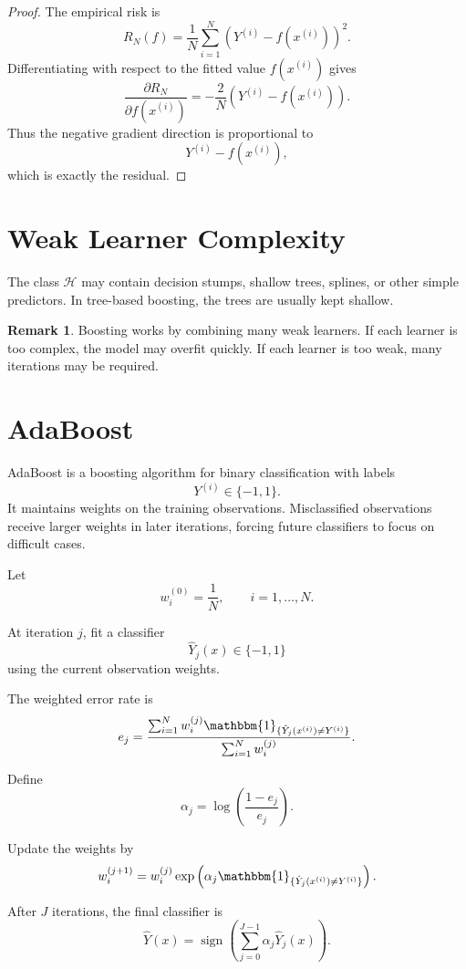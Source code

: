 \documentclass[12pt,oneside]{book}
\numberwithin{equation}{section}
\theoremstyle{definition}
\newtheorem{remark}{Remark}[section]
\theoremstyle{plain}
\theoremstyle{remark}
\newcommand{\ind}{\mathbbm{1}}
\begin{document}
\begin{proof}
The empirical risk is
\[
R_N(f)
=
\frac{1}{N}\sum_{i=1}^N (Y^{(i)}-f(x^{(i)}))^2.
\]
Differentiating with respect to the fitted value $f(x^{(i)})$ gives
\[
\frac{\partial R_N}{\partial f(x^{(i)})}
=
-\frac{2}{N}(Y^{(i)}-f(x^{(i)})).
\]
Thus the negative gradient direction is proportional to
\[
Y^{(i)}-f(x^{(i)}),
\]
which is exactly the residual.
\end{proof}

\section{Weak Learner Complexity}

The class $\mathcal{H}$ may contain decision stumps, shallow trees, splines, or other simple predictors. In tree-based boosting, the trees are usually kept shallow.

\begin{remark}
Boosting works by combining many weak learners. If each learner is too complex, the model may overfit quickly. If each learner is too weak, many iterations may be required.
\end{remark}

\section{AdaBoost}

AdaBoost is a boosting algorithm for binary classification with labels
\[
Y^{(i)}\in\{-1,1\}.
\]
It maintains weights on the training observations. Misclassified observations receive larger weights in later iterations, forcing future classifiers to focus on difficult cases.

Let
\[
w_i^{(0)}=\frac{1}{N},
\qquad
i=1,\ldots,N.
\]

At iteration $j$, fit a classifier
\[
\hat{Y}_j(x)\in\{-1,1\}
\]
using the current observation weights.

The weighted error rate is
\[
e_j
=
\frac{
\sum_{i=1}^N
w_i^{(j)}
\ind_{\{\hat{Y}_j(x^{(i)})\neq Y^{(i)}\}}
}{
\sum_{i=1}^N w_i^{(j)}
}.
\]

Define
\[
\alpha_j
=
\log\left(\frac{1-e_j}{e_j}\right).
\]

Update the weights by
\[
w_i^{(j+1)}
=
w_i^{(j)}
\exp\left(
\alpha_j
\ind_{\{\hat{Y}_j(x^{(i)})\neq Y^{(i)}\}}
\right).
\]

After $J$ iterations, the final classifier is
\[
\hat{Y}(x)
=
\operatorname{sign}
\left(
\sum_{j=0}^{J-1}
\alpha_j \hat{Y}_j(x)
\right).
\]
\end{document}
